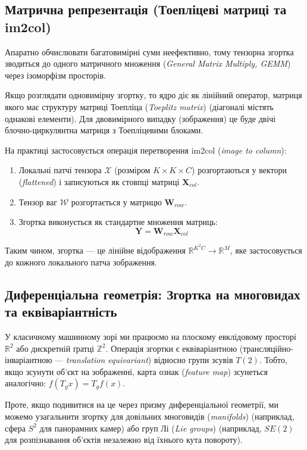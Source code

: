 \documentclass[12pt,a4paper]{article}
\begin{document}
	\subsection{Матрична репрезентація (Тоепліцеві матриці та im2col)}
	
	Апаратно обчислювати багатовимірні суми неефективно, тому тензорна згортка зводиться до одного матричного множення (\textit{General Matrix Multiply, GEMM}) через ізоморфізм просторів. 
	
	Якщо розглядати одновимірну згортку, то ядро діє як лінійний оператор, матриця якого має структуру матриці Тоепліца (\textit{Toeplitz matrix}) (діагоналі містять однакові елементи). Для двовимірного випадку (зображення) це буде двічі блочно-циркулянтна матриця з Тоепліцевими блоками.
	
	На практиці застосовується операція перетворення im2col (\textit{image to column}):
	\begin{enumerate}
		\item Локальні патчі тензора $\mathcal{X}$ (розміром $K \times K \times C$) розгортаються у вектори (\textit{flattened}) і записуються як стовпці матриці $\mathbf{X}_{col}$.
		\item Тензор ваг $\mathcal{W}$ розгортається у матрицю $\mathbf{W}_{row}$.
		\item Згортка виконується як стандартне множення матриць:
		$$ \mathbf{Y} = \mathbf{W}_{row} \mathbf{X}_{col} $$
	\end{enumerate}
	Таким чином, згортка — це лінійне відображення $\mathbb{R}^{K^2C} \to \mathbb{R}^M$, яке застосовується до кожного локального патча зображення.
	
\subsection{Диференціальна геометрія: Згортка на многовидах та еквіваріантність}

У класичному машинному зорі ми працюємо на плоскому евклідовому просторі $\mathbb{R}^2$ або дискретній ґратці $\mathbb{Z}^2$. Операція згортки є еквіваріантною (трансляційно-інваріантною — \textit{translation equivariant}) відносно групи зсувів $T(2)$. Тобто, якщо зсунути об'єкт на зображенні, карта ознак (\textit{feature map}) зсунеться аналогічно: $f(T_g x) = T_g f(x)$.

Проте, якщо подивитися на це через призму диференціальної геометрії, ми можемо узагальнити згортку для довільних многовидів (\textit{manifolds}) (наприклад, сфера $S^2$ для панорамних камер) або груп Лі (\textit{Lie groups}) (наприклад, $SE(2)$ для розпізнавання об'єктів незалежно від їхнього кута повороту).
\end{document}
